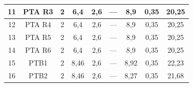 \documentclass[	DIV=calc,%
							paper=a4,%
							fontsize=12pt,%
							onecolumn]{scrartcl}	 					%
\begin{document}
{\begin{tabular}{|c|c|c|c|c|c|c|c|c|}
	11                 & PTA R3             & 2                                                    & 6,4                                         & 2,6                                           & ---                                           & 8,9                                              & 0,35                                            & 20,25                                                             \\ \hline
	12                 & PTA R4             & 2                                                    & 6,4                                         & 2,6                                           & ---                                           & 8,9                                              & 0,35                                            & 20,25                                                             \\ \hline
	13                 & PTA R5             & 2                                                    & 6,4                                         & 2,6                                           & ---                                           & 8,9                                              & 0,35                                            & 20,25                                                             \\ \hline
	14                 & PTA R6             & 2                                                    & 6,4                                         & 2,6                                           & ---                                           & 8,9                                              & 0,35                                            & 20,25                                                             \\ \hline
	15                 & PTB1               & 2                                                    & 8,46                                        & 2,6                                           & ---                                           & 8,92                                             & 0,35                                            & 22,23                                                             \\ \hline
	16                 & PTB2               & 2                                                    & 8,46                                        & 2,6                                           & ---                                           & 8,27                                             & 0,35                                            & 21,68                                                             \\ \hline

\end{tabular}}
\end{document}

